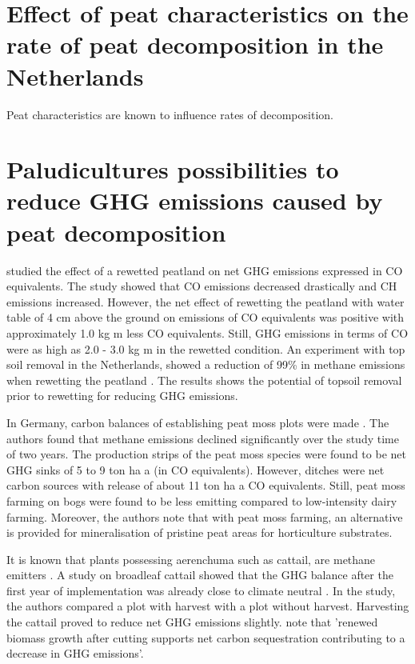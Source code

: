 {\section{Effect of peat characteristics on the rate of peat decomposition in the Netherlands}
Peat characteristics are known to influence rates of decomposition. 


\section{Paludicultures possibilities to reduce GHG emissions caused by peat decomposition}
\citet{van2013rewetting} studied the effect of a rewetted peatland on net GHG emissions expressed in CO equivalents. The study showed that CO emissions decreased drastically and CH emissions increased. However, the net effect of rewetting the peatland with water table of 4 cm above the ground on emissions of CO equivalents was positive with approximately 1.0 kg m less CO equivalents. Still, GHG emissions in terms of CO were as high as 2.0 - 3.0 kg m in the rewetted condition. An experiment with top soil removal in the Netherlands, showed a reduction of 99\% in methane emissions when rewetting the peatland \citep{harpenslager2015rewetting}. The results shows the potential of topsoil removal prior to rewetting for reducing GHG emissions. 

In Germany, carbon balances of establishing peat moss plots were made \citep{gunther2017greenhouse}. The authors found that methane emissions declined significantly over the study time of two years. The production strips of the peat moss  species were found to be net GHG sinks of 5 to 9 ton ha a (in CO equivalents). However, ditches were net carbon sources with release of about 11 ton ha a CO equivalents. Still, peat moss farming on bogs were found to be less emitting compared to low-intensity dairy farming. Moreover, the authors note that with peat moss farming, an alternative is provided for mineralisation of pristine peat areas for horticulture substrates.
 
It is known that plants possessing aerenchuma such as cattail, are methane emitters \citep{wichtmann2016paludiculture}. A study on broadleaf cattail showed that the GHG balance after the first year of implementation was already close to climate neutral \citep{guntherghgtypha}. In the study, the authors compared a plot with harvest with a plot without harvest. Harvesting the cattail proved to reduce net GHG emissions slightly. \citet{wichtmann2016paludiculture} note that 'renewed biomass growth after cutting supports net carbon sequestration contributing to a decrease in GHG emissions'. 

}
